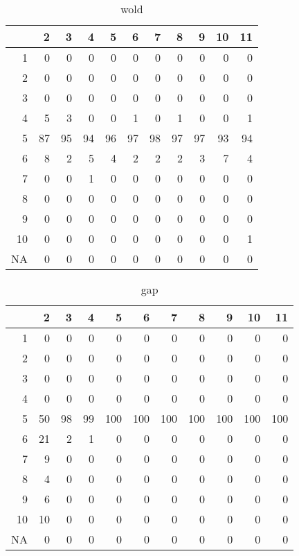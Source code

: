 \documentclass[11pt]{article}
\begin{document}
\begin{table}[H]
\centering
\begin{tabular}{rrrrrrrrrrr}
  \hline
 & 2 & 3 & 4 & 5 & 6 & 7 & 8 & 9 & 10 & 11 \\ 
  \hline
1 & 0 & 0 & 0 & 0 & 0 & 0 & 0 & 0 & 0 & 0 \\ 
  2 & 0 & 0 & 0 & 0 & 0 & 0 & 0 & 0 & 0 & 0 \\ 
  3 & 0 & 0 & 0 & 0 & 0 & 0 & 0 & 0 & 0 & 0 \\ 
  4 & 5 & 3 & 0 & 0 & 1 & 0 & 1 & 0 & 0 & 1 \\ 
  5 & 87 & 95 & 94 & 96 & 97 & 98 & 97 & 97 & 93 & 94 \\ 
  6 & 8 & 2 & 5 & 4 & 2 & 2 & 2 & 3 & 7 & 4 \\ 
  7 & 0 & 0 & 1 & 0 & 0 & 0 & 0 & 0 & 0 & 0 \\ 
  8 & 0 & 0 & 0 & 0 & 0 & 0 & 0 & 0 & 0 & 0 \\ 
  9 & 0 & 0 & 0 & 0 & 0 & 0 & 0 & 0 & 0 & 0 \\ 
  10 & 0 & 0 & 0 & 0 & 0 & 0 & 0 & 0 & 0 & 1 \\ 
  NA & 0 & 0 & 0 & 0 & 0 & 0 & 0 & 0 & 0 & 0 \\ 
   \hline
\end{tabular}
\caption{wold} 
\end{table}
\begin{table}[H]
\centering
\begin{tabular}{rrrrrrrrrrr}
  \hline
 & 2 & 3 & 4 & 5 & 6 & 7 & 8 & 9 & 10 & 11 \\ 
  \hline
1 & 0 & 0 & 0 & 0 & 0 & 0 & 0 & 0 & 0 & 0 \\ 
  2 & 0 & 0 & 0 & 0 & 0 & 0 & 0 & 0 & 0 & 0 \\ 
  3 & 0 & 0 & 0 & 0 & 0 & 0 & 0 & 0 & 0 & 0 \\ 
  4 & 0 & 0 & 0 & 0 & 0 & 0 & 0 & 0 & 0 & 0 \\ 
  5 & 50 & 98 & 99 & 100 & 100 & 100 & 100 & 100 & 100 & 100 \\ 
  6 & 21 & 2 & 1 & 0 & 0 & 0 & 0 & 0 & 0 & 0 \\ 
  7 & 9 & 0 & 0 & 0 & 0 & 0 & 0 & 0 & 0 & 0 \\ 
  8 & 4 & 0 & 0 & 0 & 0 & 0 & 0 & 0 & 0 & 0 \\ 
  9 & 6 & 0 & 0 & 0 & 0 & 0 & 0 & 0 & 0 & 0 \\ 
  10 & 10 & 0 & 0 & 0 & 0 & 0 & 0 & 0 & 0 & 0 \\ 
  NA & 0 & 0 & 0 & 0 & 0 & 0 & 0 & 0 & 0 & 0 \\ 
   \hline
\end{tabular}
\caption{gap} 
\end{table}
\end{document}
